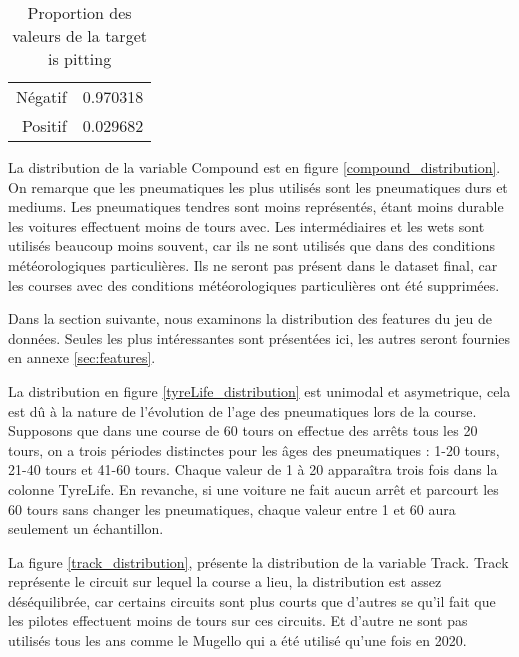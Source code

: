 \begin{table}[H]
    \begin{center}
        \caption{Proportion des valeurs de la target is pitting}
        \begin{tabular}{r|l}
            Négatif & 0.970318 \\
            Positif & 0.029682
        \end{tabular}
    \end{center}
\end{table}

La distribution de la variable Compound est en figure \ref{compound_distribution}.
On remarque que les pneumatiques les plus utilisés sont les pneumatiques durs et mediums.
Les pneumatiques tendres sont moins représentés, étant moins durable les voitures effectuent moins de tours avec.
Les intermédiaires et les wets sont utilisés beaucoup moins souvent, car ils ne sont utilisés que dans des conditions météorologiques particulières.
Ils ne seront pas présent dans le dataset final, car les courses avec des conditions météorologiques particulières ont été supprimées.


Dans la section suivante, nous examinons la distribution des features du jeu de données.
Seules les plus intéressantes sont présentées ici, les autres seront fournies en annexe \ref{sec:features}.

La distribution en figure \ref{tyreLife_distribution} est unimodal et asymetrique, cela est dû à la nature de l'évolution de l'age des pneumatiques lors de la course.
Supposons que dans une course de 60 tours on effectue des arrêts tous les 20 tours, on a trois périodes distinctes pour les âges des pneumatiques : 1-20 tours, 21-40 tours et 41-60 tours.
Chaque valeur de 1 à 20 apparaîtra trois fois dans la colonne TyreLife.
En revanche, si une voiture ne fait aucun arrêt et parcourt les 60 tours sans changer les pneumatiques, chaque valeur entre 1 et 60 aura seulement un échantillon.



La figure \ref{track_distribution}, présente la distribution de la variable Track.
Track représente le circuit sur lequel la course a lieu, la distribution est assez déséquilibrée, car certains circuits sont plus courts que d'autres se qu'il fait que les pilotes effectuent moins de tours sur ces circuits.
Et d'autre ne sont pas utilisés tous les ans comme le Mugello qui a été utilisé qu'une fois en 2020.



